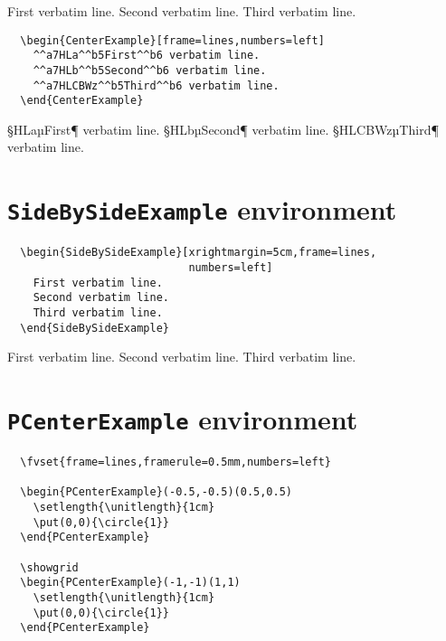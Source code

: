 \documentclass{article}
\begin{document}
\begin{CenterExample}[frame=single,numbers=right]
  First verbatim line.
  Second verbatim line.
  Third verbatim line.
\end{CenterExample}

\begin{Verbatim}
  \begin{CenterExample}[frame=lines,numbers=left]
    ^^a7HLa^^b5First^^b6 verbatim line.
    ^^a7HLb^^b5Second^^b6 verbatim line.
    ^^a7HLCBWz^^b5Third^^b6 verbatim line.
  \end{CenterExample}
\end{Verbatim}

\begin{CenterExample}[frame=lines,numbers=left]
  ^^a7HLa^^b5First^^b6 verbatim line.
  ^^a7HLb^^b5Second^^b6 verbatim line.
  ^^a7HLCBWz^^b5Third^^b6 verbatim line.
\end{CenterExample}

\section{\texttt{SideBySideExample} environment}

\begin{Verbatim}
  \begin{SideBySideExample}[xrightmargin=5cm,frame=lines,
                            numbers=left]
    First verbatim line.
    Second verbatim line.
    Third verbatim line.
  \end{SideBySideExample}
\end{Verbatim}

\begin{SideBySideExample}[xrightmargin=5cm,frame=single,numbers=left]
  First verbatim line.
  Second verbatim line.
  Third verbatim line.
\end{SideBySideExample}

\ifpstricks                     %

\section{\texttt{PCenterExample} environment}

\begin{Verbatim}
  \fvset{frame=lines,framerule=0.5mm,numbers=left}

  \begin{PCenterExample}(-0.5,-0.5)(0.5,0.5)
    \setlength{\unitlength}{1cm}
    \put(0,0){\circle{1}}
  \end{PCenterExample}

  \showgrid
  \begin{PCenterExample}(-1,-1)(1,1)
    \setlength{\unitlength}{1cm}
    \put(0,0){\circle{1}}
  \end{PCenterExample}
\end{Verbatim}
\end{document}
